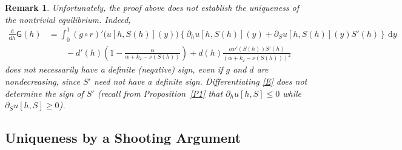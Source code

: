 \documentclass[reqno,11pt]{amsart}
\newtheorem{rem}[thm]{Remark}
\numberwithin{equation}{section}
\newcommand{\rd}{\mathrm{d}}
\begin{document}
\begin{rem}
Unfortunately, the proof above does not establish the uniqueness of the nontrivial equilibrium. Indeed,
\begin{align*}
\frac{\rd }{\rd h}\mathsf{G}(h)&=\int_0^{1} (g\circ r)'\big(u[h,S(h)](y)\big) \left\{\partial_h u[h,S(h)](y)+\partial_S u[h,S(h)](y) S'(h)\right\}\,\rd y\\
&\qquad-d'(h)\left(1-\frac{\alpha}{\alpha+k_2-\nu(S(h))}\right) +d(h)\frac{\alpha \nu'(S(h)) S'(h)}{(\alpha+k_2-\nu(S(h)))^2}
\end{align*}
does not necessarily have a definite (negative) sign, even if $g$ and $d$ are nondecreasing, since $S'$ need not have a definite sign. Differentiating \eqref{E} does not determine the sign of $S'$ (recall from Proposition~\ref{P1} that $\partial_h u[h,S]\le 0$ while $\partial_S u[h,S]\ge 0$).
\end{rem}


\subsection{Uniqueness by a Shooting Argument}\label{SS4.2} 
\end{document}
